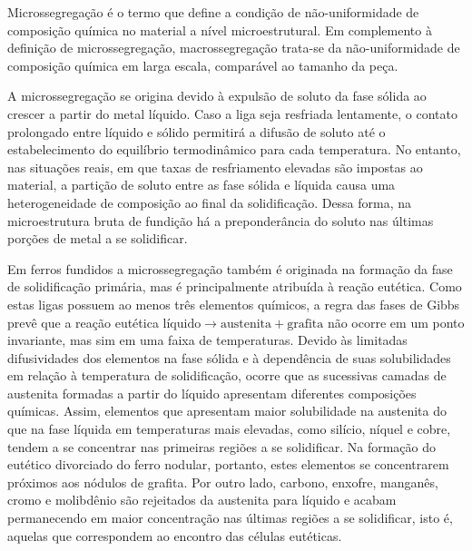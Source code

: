 Microssegregação é o termo que define a condição de não-uniformidade de composição química no material a nível microestrutural. Em complemento à definição de microssegregação, macrossegregação trata-se da não-uniformidade de composição química em larga escala, comparável ao tamanho da peça. 

A microssegregação se origina devido à expulsão de soluto da fase sólida ao crescer a partir do metal líquido. Caso a liga seja resfriada lentamente, o contato prolongado entre líquido e sólido permitirá a difusão de soluto até o estabelecimento do equilíbrio termodinâmico para cada temperatura. No entanto, nas situações reais, em que taxas de resfriamento elevadas são impostas ao material, a partição de soluto entre as fase sólida e líquida causa uma heterogeneidade de composição ao final da solidificação. Dessa forma, na microestrutura bruta de fundição há a preponderância do soluto nas últimas porções de metal a se solidificar.

Em ferros fundidos a microssegregação também é originada na formação da fase de solidificação primária, mas é principalmente atribuída à reação eutética. Como estas ligas possuem ao menos três elementos químicos, a regra das fases de Gibbs\footnotemark{} prevê que a reação eutética $\text{líquido} \rightarrow \text{austenita} + \text{grafita}$ não ocorre em um ponto invariante, mas sim em uma faixa de temperaturas. Devido às limitadas difusividades dos elementos na fase sólida e à dependência de suas solubilidades em relação à temperatura de solidificação, ocorre que as sucessivas camadas de austenita formadas a partir do líquido apresentam diferentes composições químicas. Assim, elementos que apresentam maior solubilidade na austenita do que na fase líquida em temperaturas mais elevadas, como silício, níquel e cobre, tendem a se concentrar nas primeiras regiões a se solidificar. Na formação do eutético divorciado do ferro nodular, portanto, estes elementos se concentrarem próximos aos nódulos de grafita. Por outro lado, carbono, enxofre, manganês, cromo e molibdênio são rejeitados da austenita para líquido e acabam permanecendo em maior concentração nas últimas regiões a se solidificar, isto é, aquelas que correspondem ao encontro das células eutéticas. %

